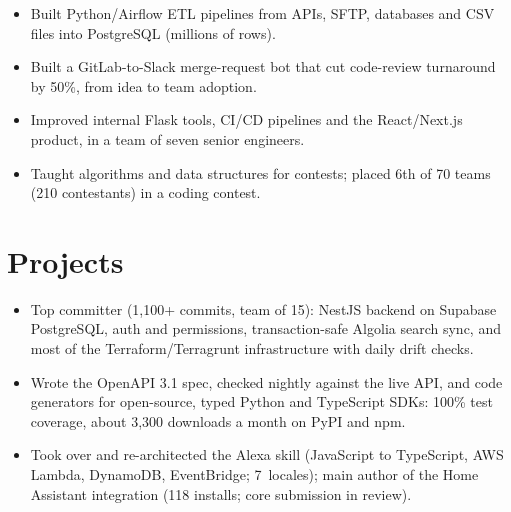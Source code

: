 \documentclass[letterpaper,10pt]{article}
\begin{document}
\begin{itemize}
  \item Built Python/Airflow ETL pipelines from APIs, SFTP, databases and CSV files into PostgreSQL (millions of rows).
  \item Built a GitLab-to-Slack merge-request bot that cut code-review turnaround by 50\%, from idea to team adoption.
  \item Improved internal Flask tools, CI/CD pipelines and the React/Next.js product, in a team of seven senior engineers.
\end{itemize}
\entrygap

\begin{itemize}
  \item Taught algorithms and data structures for contests; placed 6th of 70 teams (210 contestants) in a coding contest.
\end{itemize}

\section{Projects}

\begin{itemize}
  \item Top committer (1,100+ commits, team of 15): NestJS backend on Supabase PostgreSQL, auth and permissions,
        transaction-safe Algolia search sync, and most of the Terraform/Terragrunt infrastructure with daily drift checks.
\end{itemize}
\entrygap

\begin{itemize}
  \item Wrote the OpenAPI 3.1 spec, checked nightly against the live API, and code generators for open-source, typed
        Python and TypeScript SDKs: 100\% test coverage, about 3,300 downloads a month on PyPI and npm.
  \item Took over and re-architected the Alexa skill (JavaScript to TypeScript, AWS Lambda, DynamoDB, EventBridge;
        7~locales); main author of the Home Assistant integration (118 installs; core submission in review).
\end{itemize}
\entrygap
\end{document}
